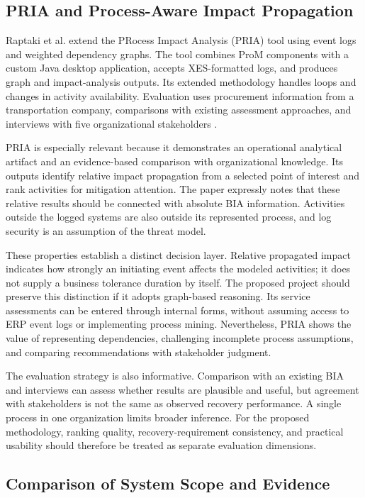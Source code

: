 \subsection{PRIA and Process-Aware Impact Propagation}

Raptaki et al. extend the PRocess Impact Analysis (PRIA) tool using event logs and weighted dependency graphs. The tool combines ProM components with a custom Java desktop application, accepts XES-formatted logs, and produces graph and impact-analysis outputs. Its extended methodology handles loops and changes in activity availability. Evaluation uses procurement information from a transportation company, comparisons with existing assessment approaches, and interviews with five organizational stakeholders \cite{raptaki2025propagation}.

PRIA is especially relevant because it demonstrates an operational analytical artifact and an evidence-based comparison with organizational knowledge. Its outputs identify relative impact propagation from a selected point of interest and rank activities for mitigation attention. The paper expressly notes that these relative results should be connected with absolute BIA information. Activities outside the logged systems are also outside its represented process, and log security is an assumption of the threat model.

These properties establish a distinct decision layer. Relative propagated impact indicates how strongly an initiating event affects the modeled activities; it does not supply a business tolerance duration by itself. The proposed project should preserve this distinction if it adopts graph-based reasoning. Its service assessments can be entered through internal forms, without assuming access to ERP event logs or implementing process mining. Nevertheless, PRIA shows the value of representing dependencies, challenging incomplete process assumptions, and comparing recommendations with stakeholder judgment.

The evaluation strategy is also informative. Comparison with an existing BIA and interviews can assess whether results are plausible and useful, but agreement with stakeholders is not the same as observed recovery performance. A single process in one organization limits broader inference. For the proposed methodology, ranking quality, recovery-requirement consistency, and practical usability should therefore be treated as separate evaluation dimensions.

\subsection{Comparison of System Scope and Evidence}

